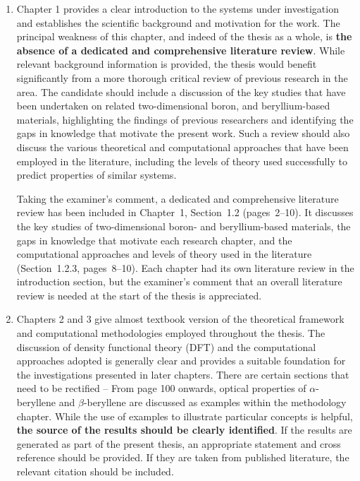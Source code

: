 \documentclass[12pt,a4paper]{article}
\newenvironment{reply}{\par\medskip\color{replyblue}}{\par\medskip}
\begin{document}
\begin{enumerate}[leftmargin=*]

\item Chapter 1 provides a clear introduction to the systems under investigation and establishes the scientific background and motivation for the work. The principal weakness of this chapter, and indeed of the thesis as a whole, is \textbf{the absence of a dedicated and comprehensive literature review}. While relevant background information is provided, the thesis would benefit significantly from a more thorough critical review of previous research in the area. The candidate should include a discussion of the key studies that have been undertaken on related two-dimensional boron, and beryllium-based materials, highlighting the findings of previous researchers and identifying the gaps in knowledge that motivate the present work. Such a review should also discuss the various theoretical and computational approaches that have been employed in the literature, including the levels of theory used successfully to predict properties of similar systems.

\begin{reply}
Taking the examiner's comment, a dedicated and comprehensive literature review has been included in Chapter~1, Section~1.2 (pages~2--10).
It discusses the key studies of two-dimensional boron- and beryllium-based materials, the gaps in knowledge that motivate each research chapter, and the computational approaches and levels of theory used in the literature (Section~1.2.3, pages~8--10).
Each chapter had its own literature review in the introduction section, but the examiner's comment that an overall literature review is needed at the start of the thesis is appreciated.
\end{reply}

\item Chapters 2 and 3 give almost textbook version of the theoretical framework and computational methodologies employed throughout the thesis. The discussion of density functional theory (DFT) and the computational approaches adopted is generally clear and provides a suitable foundation for the investigations presented in later chapters. There are certain sections that need to be rectified -- From page 100 onwards, optical properties of $\alpha$-beryllene and $\beta$-beryllene are discussed as examples within the methodology chapter. While the use of examples to illustrate particular concepts is helpful, \textbf{the source of the results should be clearly identified}. If the results are generated as part of the present thesis, an appropriate statement and cross reference should be provided. If they are taken from published literature, the relevant citation should be included.


\end{enumerate}
\end{document}
